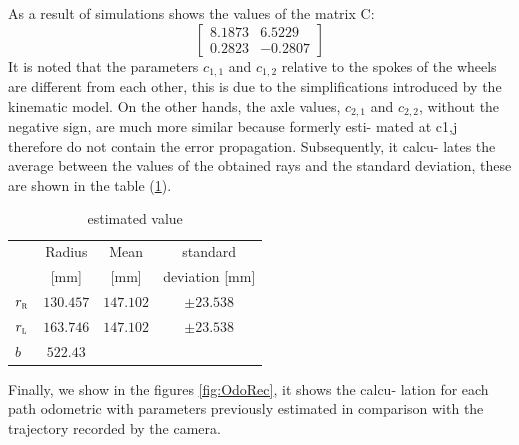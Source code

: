 As a result of simulations shows the values of the matrix C:
\begin{equation}
\label{eq:Cresult}
	\begin{bmatrix}
		8.1873  &  6.5229\\
    	0.2823 &  -0.2807
	\end{bmatrix}
\end{equation}
It is noted that the parameters $c_ {1,1}$ and $c_ {1,2}$ relative to the spokes of the wheels are different from each other, this is due to the simplifications introduced by the kinematic model. On the other hands, the axle values, $c_ {2,1}$ and $c_ {2,2}$, without the negative sign, are much more similar because formerly esti- mated at c1,j therefore do not contain the error propagation. Subsequently, it calcu- lates the average between the values of the obtained rays and the standard deviation, these are shown in the table (\ref{tab:recapvalue}).
\begin{table}[!h]
\centering
	\begin{tabular}{lccc}
		\hline
								& Radius 	& Mean 	& standard  \\
								&	[mm]	& [mm]	& deviation [mm]\\
		\hline
		$r_\textsc{r}$	&	$130.457$		& $147.102	$		&	$\pm23.538$\\
		$r_\textsc{l}$	&	$163.746$		& $147.102	$		&	$\pm23.538$\\
		$b$					&	$522.43$\\
		\hline
\end{tabular}
\caption{estimated value}
\label{tab:recapvalue}
\end{table}
Finally, we show in the figures \ref{fig:OdoRec}, it shows the calcu- lation for each path odometric with parameters previously estimated in comparison with the trajectory recorded by the camera.
